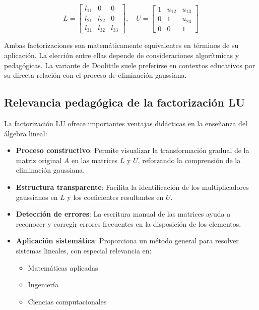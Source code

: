 \[
L = \begin{bmatrix}
	l_{11} & 0 & 0 \\
	l_{21} & l_{22} & 0 \\
	l_{31} & l_{32} & l_{33}
\end{bmatrix}, \quad
U = \begin{bmatrix}
	1 & u_{12} & u_{13} \\
	0 & 1 & u_{23} \\
	0 & 0 & 1
\end{bmatrix}
\]

	Ambas factorizaciones son matemáticamente equivalentes en términos de su aplicación. La elección entre ellas depende de consideraciones algorítmicas y pedagógicas. La variante de Doolittle suele preferirse en contextos educativos por su directa relación con el proceso de eliminación gaussiana.

\subsection{Relevancia pedagógica de la factorización LU}

La factorización LU ofrece importantes ventajas didácticas en la enseñanza del álgebra lineal:

\begin{itemize}
	\item \textbf{Proceso constructivo}: Permite visualizar la transformación gradual de la matriz original $A$ en las matrices $L$ y $U$, reforzando la comprensión de la eliminación gaussiana.
	
	\item \textbf{Estructura transparente}: Facilita la identificación de los multiplicadores gaussianos en $L$ y los coeficientes resultantes en $U$.
	
	\item \textbf{Detección de errores}: La escritura manual de las matrices ayuda a reconocer y corregir errores frecuentes en la disposición de los elementos.
	
	\item \textbf{Aplicación sistemática}: Proporciona un método general para resolver sistemas lineales, con especial relevancia en:
	\begin{itemize}
		\item Matemáticas aplicadas
		\item Ingeniería
		\item Ciencias computacionales
	\end{itemize}
\end{itemize}

